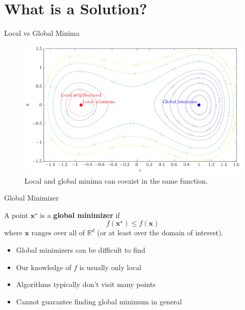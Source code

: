 \documentclass[aspectratio=1610]{beamer}
\begin{document}
\section{What is a Solution?}

\begin{frame}{Local vs Global Minima}
  \begin{figure}[h]
    \centering
    \includegraphics[height=0.8\textheight]{figures/local_global_minima.pdf}
    \caption{Local and global minima can coexist in the same function.}
  \end{figure}
\end{frame}

\begin{frame}{Global Minimizer}
  \begin{definition}
    A point $\mathbf{x}^\star$ is a \textbf{global minimizer} if 
    $$f(\mathbf{x}^\star) \leq f(\mathbf{x})$$
    where $\mathbf{x}$ ranges over all of $\mathbb{R}^d$ (or at least over the domain of interest).
  \end{definition}
  
  \vspace{0.5cm}
  \begin{itemize}
    \item Global minimizers can be difficult to find
    \item Our knowledge of $f$ is usually only local
    \item Algorithms typically don't visit many points
    \item Cannot guarantee finding global minimum in general
  \end{itemize}
\end{frame}
\end{document}
